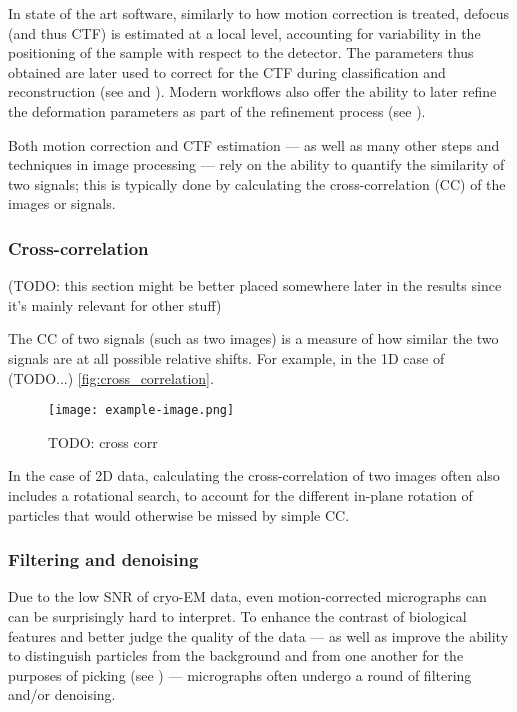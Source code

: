 In state of the art software, similarly to how motion correction is treated, defocus (and thus CTF) is estimated at a local level, accounting for variability in the positioning of the sample with respect to the detector.
The parameters thus obtained are later used to correct for the CTF during classification and reconstruction (see  and ).
Modern workflows also offer the ability to later refine the deformation parameters as part of the refinement process (see ).

Both motion correction and CTF estimation --- as well as many other steps and techniques in image processing --- rely on the ability to quantify the similarity of two signals; this is typically done by calculating the cross-correlation (CC) of the images or signals.

\subsubsection{Cross-correlation}\label{cross_correlation}

(TODO: this section might be better placed somewhere later in the results since it's mainly relevant for other stuff)

The CC of two signals (such as two images) is a measure of how similar the two signals are at all possible relative shifts. For example, in the 1D case of (TODO...) \autoref{fig:cross_correlation}.

\begin{figure}[ht]
    \centering
    \texttt{[image: example-image.png]}
    \caption{TODO: cross corr}
    \label{fig:cross_correlation}
\end{figure}

In the case of 2D data, calculating the cross-correlation of two images often also includes a rotational search, to account for the different in-plane rotation of particles that would otherwise be missed by simple CC.

\subsubsection{Filtering and denoising}\label{filtering_and_denoising}

Due to the low SNR of cryo-EM data, even motion-corrected micrographs can can be surprisingly hard to interpret.
To enhance the contrast of biological features and better judge the quality of the data --- as well as improve the ability to distinguish particles from the background and from one another for the purposes of picking (see ) --- micrographs often undergo a round of filtering and/or denoising.

